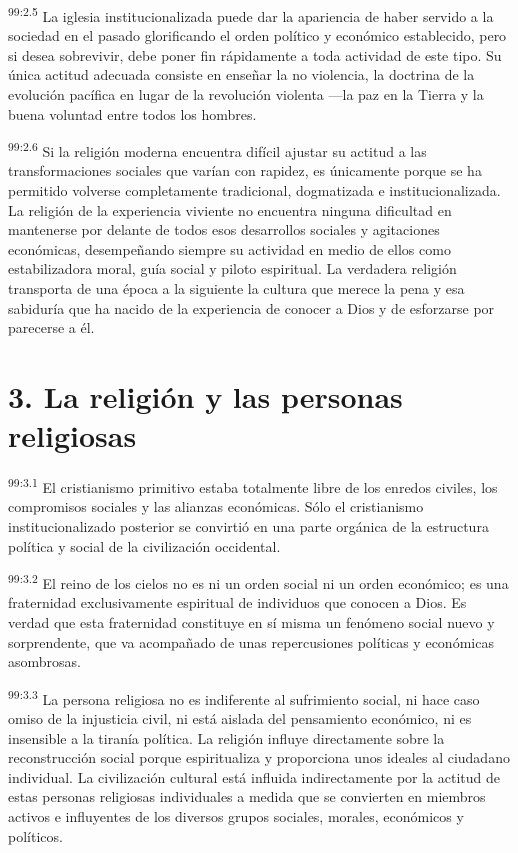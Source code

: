 \par
\textsuperscript{99:2.5} La iglesia institucionalizada puede dar la apariencia de haber servido a la sociedad en el pasado glorificando el orden político y económico establecido, pero si desea sobrevivir, debe poner fin rápidamente a toda actividad de este tipo. Su única actitud adecuada consiste en enseñar la no violencia, la doctrina de la evolución pacífica en lugar de la revolución violenta ---la paz en la Tierra y la buena voluntad entre todos los hombres.

\par
\textsuperscript{99:2.6} Si la religión moderna encuentra difícil ajustar su actitud a las transformaciones sociales que varían con rapidez, es únicamente porque se ha permitido volverse completamente tradicional, dogmatizada e institucionalizada. La religión de la experiencia viviente no encuentra ninguna dificultad en mantenerse por delante de todos esos desarrollos sociales y agitaciones económicas, desempeñando siempre su actividad en medio de ellos como estabilizadora moral, guía social y piloto espiritual. La verdadera religión transporta de una época a la siguiente la cultura que merece la pena y esa sabiduría que ha nacido de la experiencia de conocer a Dios y de esforzarse por parecerse a él.

\section*{3. La religión y las personas religiosas}
\par
\textsuperscript{99:3.1} El cristianismo primitivo estaba totalmente libre de los enredos civiles, los compromisos sociales y las alianzas económicas. Sólo el cristianismo institucionalizado posterior se convirtió en una parte orgánica de la estructura política y social de la civilización occidental.

\par
\textsuperscript{99:3.2} El reino de los cielos no es ni un orden social ni un orden económico; es una fraternidad exclusivamente espiritual de individuos que conocen a Dios. Es verdad que esta fraternidad constituye en sí misma un fenómeno social nuevo y sorprendente, que va acompañado de unas repercusiones políticas y económicas asombrosas.

\par
\textsuperscript{99:3.3} La persona religiosa no es indiferente al sufrimiento social, ni hace caso omiso de la injusticia civil, ni está aislada del pensamiento económico, ni es insensible a la tiranía política. La religión influye directamente sobre la reconstrucción social porque espiritualiza y proporciona unos ideales al ciudadano individual. La civilización cultural está influida indirectamente por la actitud de estas personas religiosas individuales a medida que se convierten en miembros activos e influyentes de los diversos grupos sociales, morales, económicos y políticos.

